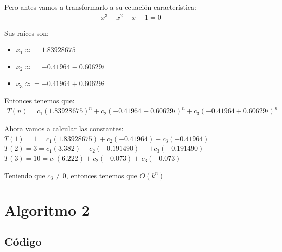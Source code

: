 \documentclass[12pt, fleqn]{article}                            %
\theoremstyle{break}                                            %
\begin{document}
        Pero antes vamos a transformarlo a su ecuación característica:
        \begin{align*}
            x^3 - x^2 - x - 1 = 0 
        \end{align*}

        Sus raíces son:
        \begin{itemize}
            \item $x_1 \approx = 1.83928675$
            \item $x_2 \approx = -0.41964 - 0.60629i$
            \item $x_3 \approx = -0.41964 + 0.60629i$
        \end{itemize}

        Entonces tenemos que:
        \begin{align*}
            T(n) = c_1(1.83928675)^n + c_2(-0.41964 - 0.60629i)^n + c_3(-0.41964 + 0.60629i)^n
        \end{align*}

        Ahora vamos a calcular las constantes:
        $T(1) = 1 = c_1(1.83928675) + c_2(-0.41964) + c_3(-0.41964)$
        $T(2) = 3 = c_1(3.382) + c_2(-0.191490) + + c_3(-0.191490)$
        $T(3) = 10 = c_1(6.222) + c_2(-0.073) + c_3(-0.073)$


        Teniendo que $c_3 \neq 0$, entonces tenemos que $O(k^n)$




\clearpage
\section{Algoritmo 2}


    \subsection{Código}

        

    \vspace{1em}
\end{document}
